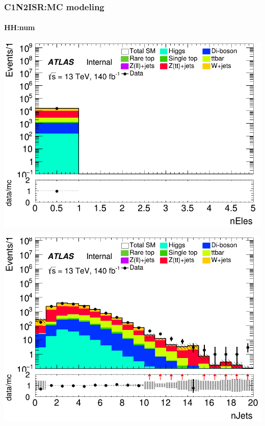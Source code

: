 \documentclass[usenames,dvipsnames]{beamer}
\begin{document}
\begin{frame}
\frametitle{C1N2ISR:MC modeling}
\framesubtitle{HH:\quad num}
    \begin{minipage}{0.32\textwidth}
        \centering
        \includegraphics[width=\textwidth]{graphics/HH_met/HH_met_nEles.png}
    \end{minipage}
    \hfill
    \begin{minipage}{0.32\textwidth}
        \centering
        \includegraphics[width=\textwidth]{graphics/HH_met/HH_met_nJets.png}
    \end{minipage}
    \hfill
    \begin{minipage}{0.32\textwidth}
        \centering

\end{minipage}
\end{frame}
\end{document}
